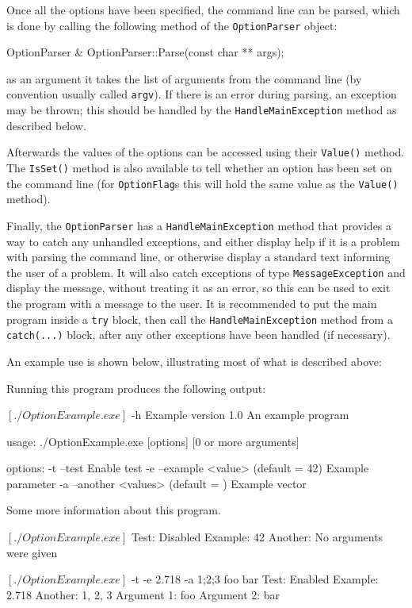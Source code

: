 Once all the options have been specified, the command line can be parsed,
which is done by calling the following method of the \texttt{OptionParser} object:
\begin{listing}
OptionParser & OptionParser::Parse(const char ** args);
\end{listing}
as an argument it takes the list of arguments from the command line (by convention usually called \texttt{argv}).
If there is an error during parsing, an exception may be thrown;
this should be handled by the \texttt{HandleMainException} method as described below.

Afterwards the values of the options can be accessed using their \texttt{Value()} method.
The \texttt{IsSet()} method is also available to tell whether an option has been set on the command line
(for \texttt{OptionFlag}s this will hold the same value as the \texttt{Value()} method).

Finally, the \texttt{OptionParser} has a \texttt{HandleMainException} method that provides
a way to catch any unhandled exceptions,
and either display help if it is a problem with parsing the command line,
or otherwise display a standard text informing the user of a problem.
It will also catch exceptions of type \texttt{MessageException} and display the message,
without treating it as an error, so this can be used to exit the program with a message to the user.
It is recommended to put the main program inside a \texttt{try} block,
then call the \texttt{HandleMainException} method from a \texttt{catch(...)} block,
after any other exceptions have been handled (if necessary).

An example use is shown below, illustrating most of what is described above:


Running this program produces the following output:
\begin{listing}[mybash]
$[./OptionExample.exe]$ -h
Example version 1.0
An example program

usage: ./OptionExample.exe [options] [0 or more arguments]

options:
  -t --test
     Enable test
  -e --example <value>	(default = 42)
     Example parameter
  -a --another <values>	(default = )
     Example vector

Some more information about this program.

$[./OptionExample.exe]$
Test: Disabled
Example: 42
Another: 
No arguments were given

$[./OptionExample.exe]$ -t -e 2.718 -a 1;2;3 foo bar
Test: Enabled
Example: 2.718
Another: 1, 2, 3
Argument 1: foo
Argument 2: bar
\end{listing}

